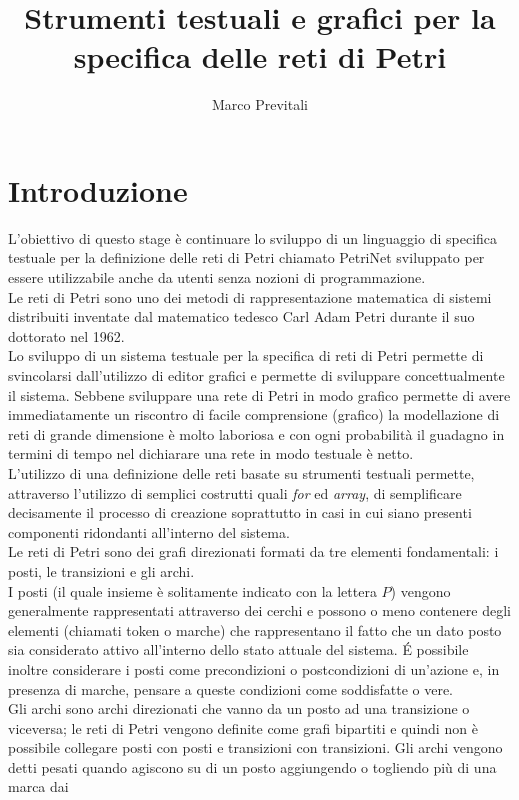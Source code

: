 \documentclass[italian,12pt]{book}
\title{Strumenti testuali e grafici per la specifica delle reti di
  Petri}
\author{Marco Previtali}
\date{}
\begin{document}

%
\tableofcontents
 \chapter{Introduzione}\label{cha:introduzione}
 L'obiettivo di questo stage è continuare lo sviluppo di un
 linguaggio di specifica testuale per la definizione delle reti di
 Petri chiamato PetriNet sviluppato per essere utilizzabile anche da utenti 
 senza nozioni di programmazione. \\
 Le reti di Petri sono uno dei metodi di rappresentazione matematica di
 sistemi distribuiti inventate dal matematico tedesco Carl Adam Petri durante il suo dottorato
 nel 1962. \\
 Lo sviluppo di un sistema testuale per la specifica di reti di Petri
 permette di svincolarsi dall'utilizzo di editor grafici e permette di
 sviluppare concettualmente il sistema. Sebbene sviluppare una rete di
 Petri in modo grafico permette di avere immediatamente un riscontro di
 facile comprensione (grafico) la modellazione di reti di grande
 dimensione è molto laboriosa e con ogni probabilità il guadagno in termini di tempo
 nel dichiarare una rete in modo testuale è netto.\\
 L'utilizzo di una definizione delle reti basate su strumenti testuali
 permette, attraverso l'utilizzo di semplici costrutti quali \emph{for}
 ed \emph{array}, di semplificare decisamente il processo di creazione
 soprattutto in casi in cui siano presenti componenti ridondanti
 all'interno del sistema. \\
 Le reti di Petri sono dei grafi direzionati formati da tre elementi fondamentali:
 i posti, le transizioni e gli archi. \\
 I posti (il quale insieme è solitamente indicato con la lettera $P$)
 vengono generalmente rappresentati attraverso dei cerchi e possono o
 meno contenere degli elementi (chiamati token o marche) che
 rappresentano il fatto che un dato posto sia considerato attivo all'interno
 dello stato attuale del sistema. \'E possibile inoltre considerare i
 posti come precondizioni o postcondizioni di un'azione e, in presenza di marche, pensare
 a queste condizioni come soddisfatte o vere.\\
 Gli archi sono archi direzionati che vanno da un posto ad una
 transizione o viceversa; le reti di Petri vengono definite come grafi
 bipartiti e quindi non è possibile collegare posti con posti e
 transizioni con transizioni. Gli archi vengono detti pesati quando
 agiscono su di un posto aggiungendo o togliendo più di una marca dai
\end{document}
